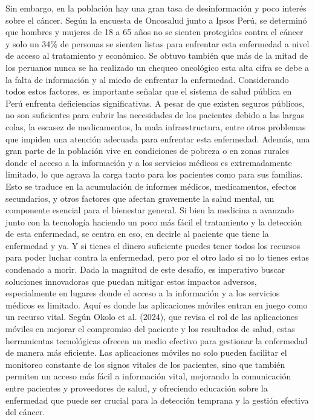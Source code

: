 Sin embargo, en la población hay una gran tasa de desinformación y poco interés sobre el cáncer. Según la encuesta de Oncosalud junto a Ipsos Perú, se determinó que hombres y mujeres de 18 a 65 años no se sienten protegidos contra el cáncer y solo un 34\% de personas se sienten listas para enfrentar esta enfermedad a nivel de acceso al tratamiento y económico. Se obtuvo también que más de la mitad de los peruanos nunca se ha realizado un chequeo oncológico esta alta cifra se debe a la falta de información y al miedo de enfrentar la enfermedad.
Considerando todos estos factores, es importante señalar que el sistema de salud pública en Perú enfrenta deficiencias significativas. A pesar de que existen seguros públicos, no son suficientes para cubrir las necesidades de los pacientes debido a las largas colas, la escasez de medicamentos, la mala infraestructura, entre otros problemas que impiden una atención adecuada para enfrentar esta enfermedad. Además, una gran parte de la población vive en condiciones de pobreza o en zonas rurales donde el acceso a la información y a los servicios médicos es extremadamente limitado, lo que agrava la carga tanto para los pacientes como para sus familias. Esto se traduce en la acumulación de informes médicos, medicamentos, efectos secundarios, y otros factores que afectan gravemente la salud mental, un componente esencial para el bienestar general.
Si bien la medicina a avanzado junto con la tecnología haciendo un poco más fácil el tratamiento y la detección de esta enfermedad, se centra en eso, en decirle al paciente que tiene la enfermedad y ya. Y si tienes el dinero suficiente puedes tener todos los recursos para poder luchar contra la enfermedad, pero por el otro lado si no lo tienes estas condenado a morir.
Dada la magnitud de este desafío, es imperativo buscar soluciones innovadoras que puedan mitigar estos impactos adversos, especialmente en lugares donde el acceso a la información y a los servicios médicos es limitado. Aquí es donde las aplicaciones móviles entran en juego como un recurso vital. Según Okolo et al. (2024), que revisa el rol de las aplicaciones móviles en mejorar el compromiso del paciente y los resultados de salud, estas herramientas tecnológicas ofrecen un medio efectivo para gestionar la enfermedad de manera más eficiente. Las aplicaciones móviles no solo pueden facilitar el monitoreo constante de los signos vitales de los pacientes, sino que también permiten un acceso más fácil a información vital, mejorando la comunicación entre pacientes y proveedores de salud, y ofreciendo educación sobre la enfermedad que puede ser crucial para la detección temprana y la gestión efectiva del cáncer.
